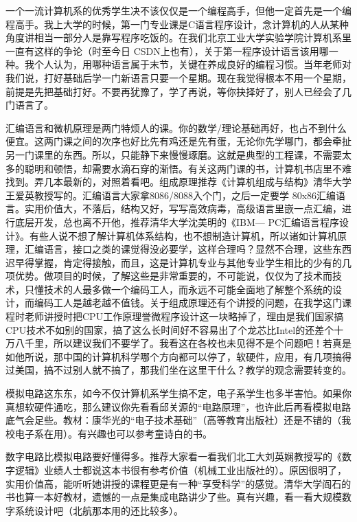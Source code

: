 一个一流计算机系的优秀学生决不该仅仅是一个编程高手，但他一定首先是一个编程高手。我上大学的时候，第一门专业课是C语言程序设计，念计算机的人从某种角度讲相当一部分人是靠写程序吃饭的。在我们北京工业大学实验学院计算机系里一直有这样的争论（时至今日 CSDN上也有），关于第一程序设计语言该用哪一种。我个人认为，用哪种语言属于末节，关键在养成良好的编程习惯。当年老师对我们说，打好基础后学一门新语言只要一个星期。现在我觉得根本不用一个星期，前提是先把基础打好。不要再犹豫了，学了再说，等你抉择好了，别人已经会了几门语言了。

汇编语言和微机原理是两门特烦人的课。你的数学/理论基础再好，也占不到什么便宜。这两门课之间的次序也好比先有鸡还是先有蛋，无论你先学哪门，都会牵扯另一门课里的东西。所以，只能静下来慢慢琢磨。这就是典型的工程课，不需要太多的聪明和顿悟，却需要水滴石穿的渐悟。有关这两门课的书，计算机书店里不难找到。弄几本最新的，对照着看吧。组成原理推荐《计算机组成与结构》清华大学王爱英教授写的。汇编语言大家拿8086/8088入个门，之后一定要学 80x86汇编语言。实用价值大，不落后，结构又好，写写高效病毒，高级语言里嵌一点汇编，进行底层开发，总也离不开他，推荐清华大学沈美明的《IBM— PC汇编语言程序设计》。有些人说不想了解计算机体系结构，也不想制造计算机，所以诸如计算机原理，汇编语言，接口之类的课觉得没必要学，这样合理吗？显然不合理，这些东西迟早得掌握，肯定得接触，而且，这是计算机专业与其他专业学生相比的少有的几项优势。做项目的时候，了解这些是非常重要的，不可能说，仅仅为了技术而技术，只懂技术的人最多做一个编码工人，而永远不可能全面地了解整个系统的设计，而编码工人是越老越不值钱。关于组成原理还有个讲授的问题，在我学这门课程时老师讲授时把CPU工作原理誉微程序设计这一块略掉了，理由是我们国家搞CPU技术不如别的国家，搞了这么长时间好不容易出了个龙芯比Intel的还差个十万八千里，所以建议我们不要学了。我看这在各校也未见得不是个问题吧！若真是如他所说，那中国的计算机科学哪个方向都可以停了，软硬件，应用，有几项搞得过美国，搞不过别人就不搞了，那我们坐在这里干什么？教学的观念需要转变的。

模拟电路这东东，如今不仅计算机系学生搞不定，电子系学生也多半害怕。如果你真想软硬件通吃，那么建议你先看看邱关源的“电路原理”，也许此后再看模拟电路底气会足些。教材：康华光的“电子技术基础”（高等教育出版社）还是不错的（我校电子系在用）。有兴趣也可以参考童诗白的书。

数字电路比模拟电路要好懂得多。推荐大家看一看我们北工大刘英娴教授写的《数字逻辑》业绩人士都说这本书很有参考价值（机械工业出版社的）。原因很明了，实用价值高，能听听她讲授的课程更是有一种“享受科学”的感觉。清华大学阎石的书也算一本好教材，遗憾的一点是集成电路讲少了些。真有兴趣，看一看大规模数字系统设计吧（北航那本用的还比较多）。

